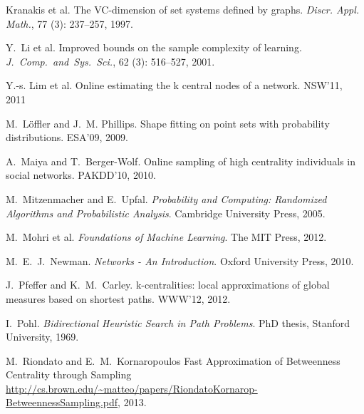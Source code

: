\begin{thebibliography}{33}
Kranakis et al.
\newblock The {VC}-dimension of set systems defined by graphs.
\newblock \emph{Discr. Appl. Math.}, 77 (3):
  237--257, 1997.

Y.~Li et al.
\newblock Improved bounds on the sample complexity of learning.
\newblock \emph{J.~Comp.~and~Sys.~Sci.}, 62
  (3): 516--527, 2001.

Y.-s. Lim et al.
\newblock Online estimating the k central nodes of a network.
\newblock NSW'11, 2011

M.~L\"{o}ffler and J.~M. Phillips.
\newblock Shape fitting on point sets with probability distributions.
\newblock ESA'09, 2009.

A.~Maiya and T.~Berger-Wolf.
\newblock Online sampling of high centrality individuals in social networks.
\newblock PAKDD'10, 2010.

M.~Mitzenmacher and E.~Upfal.
\newblock \emph{Probability and Computing: Randomized Algorithms and
  Probabilistic Analysis}.
\newblock Cambridge University Press, 2005.

M.~Mohri et al.
\newblock \emph{Foundations of Machine Learning}.
\newblock The MIT Press, 2012.

M.~E.~J.~Newman.
\newblock \emph{Networks - An Introduction}.
\newblock Oxford University Press, 2010.

J.~Pfeffer and K.~M.~Carley.
\newblock k-centralities: local approximations of global measures based on
  shortest paths.
\newblock WWW'12, 2012.

I.~Pohl.
\newblock \emph{Bidirectional Heuristic Search in Path Problems}.
\newblock PhD thesis, Stanford University, 1969.

 M.~Riondato and E.~M.~Kornaropoulos
 \newblock Fast Approximation of Betweenness Centrality through Sampling
 \newblock
 \url{http://cs.brown.edu/~matteo/papers/RiondatoKornarop-BetweennessSampling.pdf}, 2013.


\end{thebibliography}
